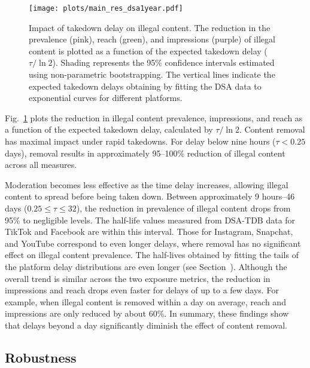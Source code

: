 \documentclass{article}
\begin{document}
\begin{figure}
\centering
\texttt{[image: plots/main\_res\_dsa1year.pdf]}
\caption{Impact of takedown delay on illegal content. The reduction in the prevalence (pink), reach (green), and impressions (purple) of illegal content is plotted as a function of the expected takedown delay ($\tau / \ln 2$). 
Shading represents the 95\% confidence intervals estimated using non-parametric bootstrapping. 
The vertical lines indicate the expected takedown delays obtaining by fitting the DSA data to exponential curves for different platforms. 
}
\label{fig:res_frac}
\end{figure} 

Fig.~\ref{fig:res_frac} plots the reduction in illegal content prevalence, impressions, and reach as a function of the expected takedown delay, calculated by $\tau/ \ln 2$. Content removal has maximal impact under rapid takedowns. For delay below nine hours ($\tau < 0.25$ days), removal results in approximately 95--100\% reduction of illegal content across all measures. 

Moderation becomes less effective as the time delay increases, allowing illegal content to spread before being taken down. 
Between approximately 9 hours--46 days ($0.25 \leq \tau \leq 32$), the reduction in prevalence of illegal content drops from 95\% to negligible levels. 
The half-life values measured from DSA-TDB data for TikTok and Facebook are within this interval. 
Those for Instagram, Snapchat, and YouTube correspond to even longer delays, where removal has no significant effect on illegal content prevalence. 
The half-lives obtained by fitting the tails of the platform delay distributions are even longer (see Section~). 
Although the overall trend is similar across the two exposure metrics, the reduction in impressions and reach drops even faster for delays of up to a few days. 
For example, when illegal content is removed within a day on average, reach and impressions are only reduced by about 60\%.
In summary, these findings show that delays beyond a day significantly diminish the effect of content removal. 

\subsection*{Robustness}
\label{sec:illegal_prob}
\end{document}
